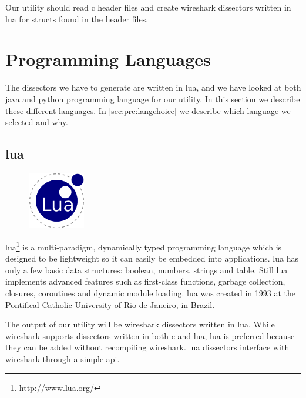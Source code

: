 Our \gls{utility} should read \Gls{c} \gls{header} files and create \Gls{wireshark} \glspl{dissector} written
in \Gls{lua} for \glspl{struct} found in the \gls{header} files.


\section{Programming Languages}
\label{sec:pre:langs}
The \glspl{dissector} we have to generate are written in \Gls{lua}, and we have looked at
both \Gls{java} and \Gls{python} programming language for our \gls{utility}. In this section we
describe these different languages. In \autoref{sec:pre:langchoice} we describe
which language we selected and why.

\subsection{\Gls{lua}}
\begin{figure}
	\vspace{-10pt}
	\includegraphics[width=2.5cm]{./planning/img/lua_logo}
	\vspace{-20pt}
\end{figure}
\Gls{lua}\footnote{\url{http://www.lua.org/}} is a multi-paradigm, dynamically typed
programming language which is designed to be lightweight so it can easily be
embedded into applications. \Gls{lua} has only a few basic data structures: boolean,
numbers, strings and table. Still \Gls{lua} implements advanced features such as
first-class functions, garbage collection, closures, coroutines and dynamic
module loading. \Gls{lua} was created in 1993 at the Pontifical Catholic University
of Rio de Janeiro, in Brazil.\cite{LuaORG}

The output of our \gls{utility} will be \Gls{wireshark} \glspl{dissector} written in \Gls{lua}. While
\Gls{wireshark} supports \glspl{dissector} written in both \Gls{c} and \Gls{lua}, \Gls{lua} is preferred
because they can be added without recompiling \Gls{wireshark}. \Gls{lua} \glspl{dissector}
interface with \Gls{wireshark} through a simple \Gls{api}.

